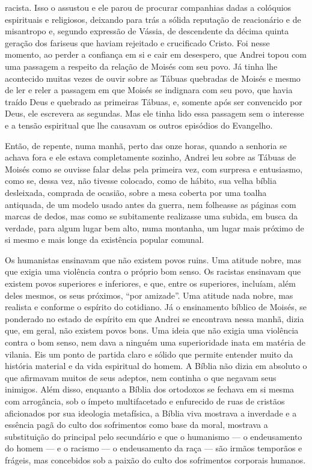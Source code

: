 racista. Isso o assustou e ele parou de procurar companhias dadas a
colóquios espirituais e religiosos, deixando para trás a sólida
reputação de reacionário e de misantropo e, segundo expressão de Vássia,
de descendente da décima quinta geração dos fariseus que haviam
rejeitado e crucificado Cristo. Foi nesse momento, ao perder a confiança
em si e cair em desespero, que Andrei topou com uma passagem a respeito
da relação de Moisés com seu povo. Já tinha lhe acontecido muitas vezes
de ouvir sobre as Tábuas quebradas de Moisés e mesmo de ler e reler a
passagem em que Moisés se indignara com seu povo, que havia traído Deus
e quebrado as primeiras Tábuas, e, somente após ser convencido por Deus,
ele escrevera as segundas. Mas ele tinha lido essa passagem sem o
interesse e a tensão espiritual que lhe causavam os outros episódios do
Evangelho.

Então, de repente, numa manhã, perto das onze horas, quando a senhoria
se achava fora e ele estava completamente sozinho, Andrei leu sobre as
Tábuas de Moisés como se ouvisse falar delas pela primeira vez, com
surpresa e entusiasmo, como se, dessa vez, não tivesse colocado, como de
hábito, sua velha bíblia desleixada, comprada de ocasião, sobre a mesa
coberta por uma toalha antiquada, de um modelo usado antes da guerra,
nem folheasse as páginas com marcas de dedos, mas como se subitamente
realizasse uma subida, em busca da verdade, para algum lugar bem alto,
numa montanha, um lugar mais próximo de si mesmo e mais longe da
existência popular comunal.

Os humanistas ensinavam que não existem povos ruins. Uma atitude nobre,
mas que exigia uma violência contra o próprio bom senso. Os racistas
ensinavam que existem povos superiores e inferiores, e que, entre os
superiores, incluíam, além deles mesmos, os seus próximos, ``por
amizade''. Uma atitude nada nobre, mas realista e conforme o espírito do
cotidiano. Já o ensinamento bíblico de Moisés, se ponderado no estado de
espírito em que Andrei se encontrava nessa manhã, dizia que, em geral,
não existem povos bons. Uma ideia que não exigia uma violência contra o
bom senso, nem dava a ninguém uma superioridade inata em matéria de
vilania. Eis um ponto de partida claro e sólido que permite entender
muito da história material e da vida espiritual do homem. A Bíblia não
dizia em absoluto o que afirmavam muitos de seus adeptos, nem continha o
que negavam seus inimigos. Além disso, enquanto a Bíblia dos ortodoxos
se fechava em si mesma com arrogância, sob o ímpeto multifacetado e
enfurecido de ruas de cristãos aficionados por sua ideologia metafísica,
a Bíblia viva mostrava a inverdade e a essência pagã do culto dos
sofrimentos como base da moral, mostrava a substituição do principal
pelo secundário e que o humanismo --- o endeusamento do homem --- e o
racismo --- o endeusamento da raça --- são irmãos temporãos e frágeis,
mas concebidos sob a paixão do culto dos sofrimentos corporais humanos.

